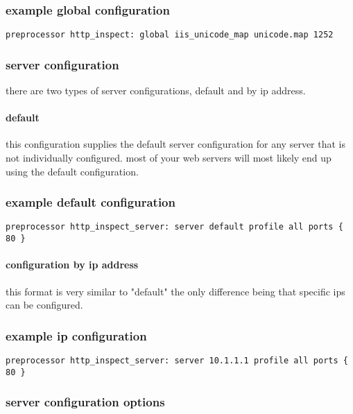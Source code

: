\documentclass[english]{report}
\begin{document}
\subsubsection{example global configuration}

\begin{verbatim}
preprocessor http_inspect: global iis_unicode_map unicode.map 1252
\end{verbatim}

\subsubsection{server configuration}
there are two types of server configurations, default and by ip address.

\paragraph{default}

this configuration supplies the default server configuration for any server
that is not individually configured.  most of your web servers will most likely
end up using the default configuration.

\subsubsection{example default configuration}
\begin{verbatim}
preprocessor http_inspect_server: server default profile all ports { 80 }
\end{verbatim}

\paragraph{configuration by ip address}
this format is very similar to "default" the only difference being that
specific ips can be configured.

\subsubsection{example ip configuration}
\begin{verbatim}
preprocessor http_inspect_server: server 10.1.1.1 profile all ports { 80 }
\end{verbatim}

\subsubsection{server configuration options}
\end{document}
